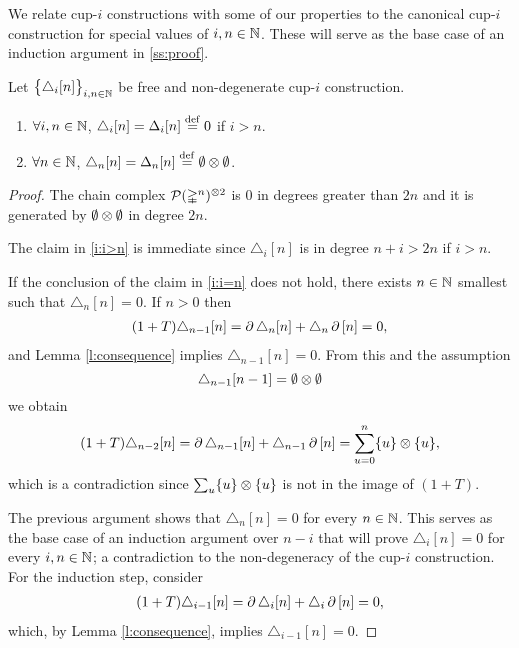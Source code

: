We relate cup-$i$ constructions with some of our properties to the canonical cup-$i$ construction for special values of $i,n \in \mathbb{N}$.
These will serve as the base case of an induction argument in \cref{ss:proof}.

\begin{lemma} \label{l:special case one}
	Let $\big\{ \triangle_i [n] \big\}_{i,n\in\mathbb{N}}$ be free and non-degenerate \mbox{cup-$i$} construction.
	\begin{enumerate}
		\item \label{i:i>n} $\forall i,n \in \mathbb{N}$, $\triangle_i[n] = \Delta_i [n] \stackrel{\mathrm{def}}{=} 0$ if $i > n$.
		\item \label{i:i=n} $\forall n \in \mathbb{N}$, $\triangle_n[n] = \Delta_n [n] \stackrel{\mathrm{def}}{=} \emptyset \otimes \emptyset$.
	\end{enumerate}
\end{lemma}

\begin{proof}
	The chain complex $\mathcal{P}(\mathbb{\Delta}^n)^{\otimes 2}$ is $0$ in degrees greater than $2n$ and it is generated by $\emptyset \otimes \emptyset$ in degree $2n$.

	The claim in \cref{i:i>n} is immediate since $\triangle_i[n]$ is in degree $n+i > 2n$ if $i > n$.

	If the conclusion of the claim in \cref{i:i=n} does not hold, there exists $n \in \mathbb{N}$ smallest such that $\triangle_n [n] = 0$.
	If $n > 0$ then
	\begin{align*}
	(1+T) \triangle_{n-1} [n] =
	\operatorname{\partial} \triangle_{n} [n] + \triangle_{n} \operatorname{\partial} \, [n] = 0,
	\end{align*}
	and Lemma \ref{l:consequence} implies $\triangle_{n-1} [n] = 0$.
	From this and the assumption
	\[
	\triangle_{n-1}[n-1] = \emptyset \otimes \emptyset
	\]
	we obtain
	\begin{equation}
	\begin{split}
	(1+T)\triangle_{n-2} [n] =
	\operatorname{\partial} \triangle_{n-1} [n] + \triangle_{n-1} \operatorname{\partial} \, [n] =
	\sum_{u = 0}^n \{u\} \otimes \{u\},
	\end{split}
	\end{equation}
	which is a contradiction since $\sum_u \{u\} \otimes \{u\}$ is not in the image of $(1+T)$.

	The previous argument shows that $\triangle_n [n] = 0$ for every $n \in \mathbb{N}$.
	This serves as the base case of an induction argument over $n-i$ that will prove $\triangle_i [n] = 0$ for every $i, n \in \mathbb{N}$; a contradiction to the non-degeneracy of the cup-$i$ construction.
	For the induction step, consider
	\begin{align*}
	(1+T) \triangle_{i-1} [n] =
	\operatorname{\partial} \triangle_{i} [n] + \triangle_{i} \operatorname{\partial}\, [n] = 0,
	\end{align*}
	which, by Lemma \ref{l:consequence}, implies $\triangle_{i-1} [n] = 0$.
\end{proof}

